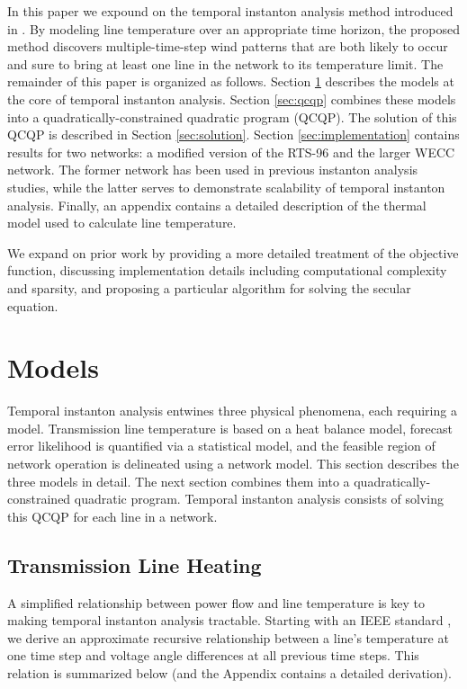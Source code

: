 \documentclass[journal,twoside]{IEEEtran}
\begin{document}
In this paper we expound on the temporal instanton analysis method introduced in \cite{kersulis2015}. By modeling line temperature over an appropriate time horizon, the proposed method discovers multiple-time-step wind patterns that are both likely to occur and sure to bring at least one line in the network to its temperature limit. The remainder of this paper is organized as follows. Section \ref{sec:models} describes the models at the core of temporal instanton analysis. Section \ref{sec:qcqp} combines these models into a quadratically-constrained quadratic program (QCQP). The solution of this QCQP is described in Section \ref{sec:solution}. Section \ref{sec:implementation}  contains results for two networks: a modified version of the RTS-96 and the larger WECC network. The former network has been used in previous instanton analysis studies, while the latter serves to demonstrate scalability of temporal instanton analysis. Finally, an appendix contains a detailed description of the thermal model used to calculate line temperature.

We expand on prior work by providing a more detailed treatment of the objective function, discussing implementation details including computational complexity and sparsity, and proposing a particular algorithm for solving the secular equation.

\section{Models}\label{sec:models}
Temporal instanton analysis entwines three physical phenomena, each requiring a model. Transmission line temperature is based on a heat balance model, forecast error likelihood is quantified via a statistical model, and the feasible region of network operation is delineated using a network model. This section describes the three models in detail. The next section combines them into a quadratically-constrained quadratic program. Temporal instanton analysis consists of solving this QCQP for each line in a network.


\subsection{Transmission Line Heating}\label{sec:models-heat}
A simplified relationship between power flow and line temperature is key to making temporal instanton analysis tractable. Starting with an IEEE standard \cite{ieee2013}, we derive an approximate recursive relationship between a line's temperature at one time step and voltage angle differences at all previous time steps. This relation is summarized below (and the Appendix contains a detailed derivation).
\end{document}
